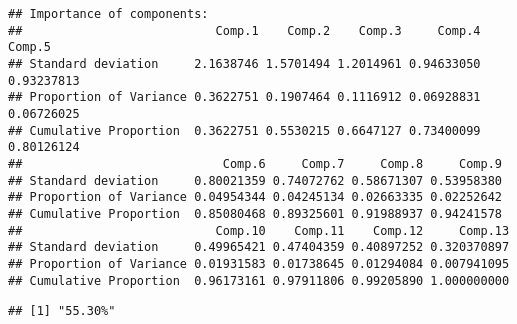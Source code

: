 \documentclass[]{article}
\newenvironment{Shaded}{\begin{snugshade}}{\end{snugshade}}
\newcommand{\KeywordTok}[1]{\textcolor[rgb]{0.13,0.29,0.53}{\textbf{#1}}}
\newcommand{\DataTypeTok}[1]{\textcolor[rgb]{0.13,0.29,0.53}{#1}}
\newcommand{\DecValTok}[1]{\textcolor[rgb]{0.00,0.00,0.81}{#1}}
\newcommand{\StringTok}[1]{\textcolor[rgb]{0.31,0.60,0.02}{#1}}
\newcommand{\CommentTok}[1]{\textcolor[rgb]{0.56,0.35,0.01}{\textit{#1}}}
\newcommand{\OperatorTok}[1]{\textcolor[rgb]{0.81,0.36,0.00}{\textbf{#1}}}
\newcommand{\NormalTok}[1]{#1}
\begin{document}
\begin{verbatim}
## Importance of components:
##                           Comp.1    Comp.2    Comp.3     Comp.4     Comp.5
## Standard deviation     2.1638746 1.5701494 1.2014961 0.94633050 0.93237813
## Proportion of Variance 0.3622751 0.1907464 0.1116912 0.06928831 0.06726025
## Cumulative Proportion  0.3622751 0.5530215 0.6647127 0.73400099 0.80126124
##                            Comp.6     Comp.7     Comp.8     Comp.9
## Standard deviation     0.80021359 0.74072762 0.58671307 0.53958380
## Proportion of Variance 0.04954344 0.04245134 0.02663335 0.02252642
## Cumulative Proportion  0.85080468 0.89325601 0.91988937 0.94241578
##                           Comp.10    Comp.11    Comp.12     Comp.13
## Standard deviation     0.49965421 0.47404359 0.40897252 0.320370897
## Proportion of Variance 0.01931583 0.01738645 0.01294084 0.007941095
## Cumulative Proportion  0.96173161 0.97911806 0.99205890 1.000000000
\end{verbatim}

\begin{Shaded}
\end{Shaded}

\begin{verbatim}
## [1] "55.30%"
\end{verbatim}
\end{document}

